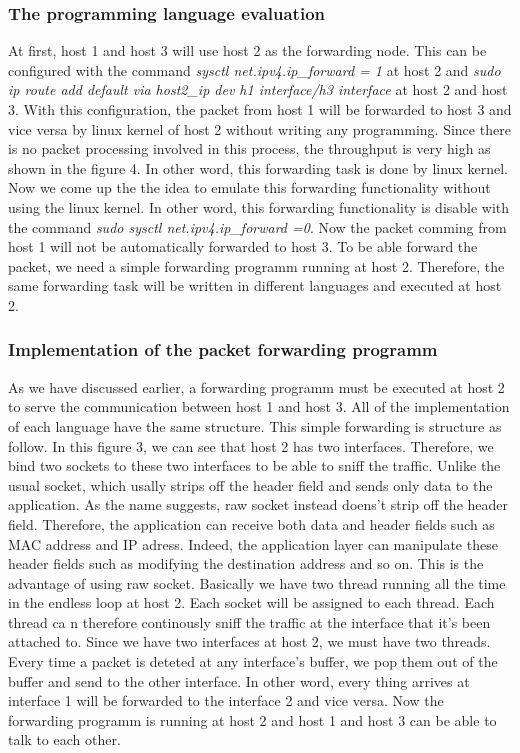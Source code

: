 \subsubsection{The programming language evaluation}
At first, host 1 and host 3 will use host 2 as the forwarding node. This can be configured with the command \textit{sysctl net.ipv4.ip\_forward = 1} at host 2 and \textit{sudo ip route add default via host2\_ip dev h1 interface/h3 interface} at host 2 and host 3. With this configuration, the packet from host 1 will be forwarded to host 3 and vice versa by linux kernel of host 2 without writing any programming. Since there is no packet processing involved in this process, the throughput is very high as shown in the figure 4. In other word, this forwarding task is done by linux kernel. Now we come up the the idea to emulate this forwarding functionality without using the linux kernel. In other word, this forwarding functionality is disable with the command \textit{sudo sysctl net.ipv4.ip\_forward =0}. Now the packet comming from host 1 will not be automatically forwarded to host 3. To be able forward the packet, we need a simple forwarding programm running at host 2. Therefore, the same forwarding task will be written in different languages and executed at host 2.

\subsubsection{Implementation of the packet forwarding programm}
As we have discussed earlier, a forwarding programm must be executed at host 2 to serve the communication between host 1 and host 3. All of the implementation of each language have the same structure. This simple forwarding is structure as follow. In this figure 3, we can see that host 2 has two interfaces. Therefore, we bind two sockets to these two interfaces to be able to sniff the traffic. Unlike the usual socket, which usally strips off the header field and sends only data to the application. As the name suggests, raw socket instead doens't strip off the header field. Therefore, the application can receive both data and header fields such as MAC address and IP adress. Indeed, the application layer can manipulate these header fields such as modifying the destination address and so on. This is the advantage of using raw socket. Basically we have two thread running all the time in the endless loop at host 2. Each socket will be assigned to each thread. Each thread ca n therefore continously sniff the traffic at the interface that it's been attached to. Since we have two interfaces at host 2, we must have two threads. Every time a packet is deteted at any interface's buffer, we pop them out of the buffer and send to the other interface. In other word, every thing arrives at interface 1 will be forwarded to the interface 2 and vice versa. Now the forwarding programm is running at host 2 and host 1 and host 3 can be able to talk to each other.

